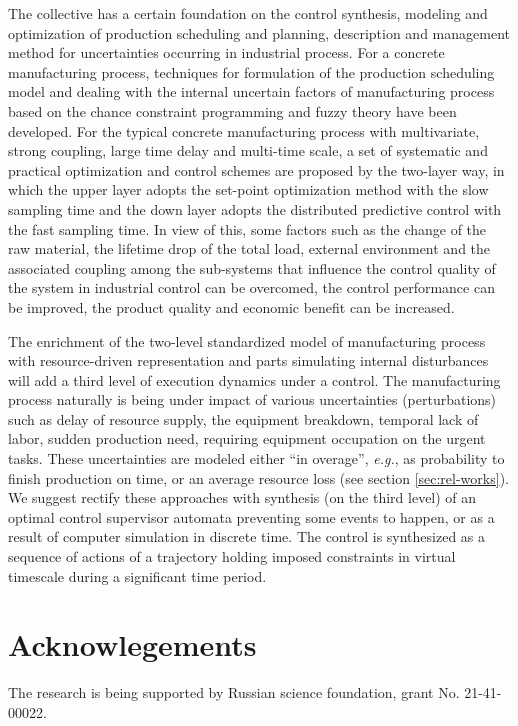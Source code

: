 \documentclass[conference,a4paper]{IEEEtran}
\begin{document}
The collective has a certain foundation on the control synthesis, modeling and optimization of production scheduling and planning, description and management method for uncertainties occurring in industrial process. For a concrete manufacturing process, techniques for formulation of the production scheduling model and dealing with the internal uncertain factors of manufacturing process based on the chance constraint programming and fuzzy theory \cite{b6} have been developed. For the typical concrete manufacturing process with multivariate, strong coupling, large time delay and multi-time scale, a set of systematic and practical optimization and control schemes are proposed by the two-layer way, in which the upper layer adopts the set-point optimization method with the slow sampling time and the down layer adopts the distributed predictive control with the fast sampling time. In view of this, some factors such as the change of the raw material, the lifetime drop of the total load, external environment and the associated coupling among the sub-systems that influence the control quality of the system in industrial control can be overcomed, the control performance can be improved, the product quality and economic benefit can be increased.

The enrichment of the two-level standardized model of manufacturing process with resource-driven representation and parts simulating internal disturbances will add a third level of execution dynamics under a control.  The manufacturing process naturally is being under impact of various uncertainties (perturbations) such as delay of resource supply, the equipment breakdown, temporal lack of labor, sudden production need, requiring equipment occupation on the urgent tasks. These uncertainties are modeled either ``in overage'', \emph{e.g.}, as probability to finish production on time, or an average resource loss (see section \ref{sec:rel-works}).  We suggest rectify these approaches with synthesis (on the third level) of an optimal control supervisor automata preventing some events to happen, or as a result of computer simulation in discrete time. The control is synthesized as a sequence of actions of a trajectory holding imposed constraints in virtual timescale during a significant time period.

\section*{Acknowlegements}
\label{sec:ack}

The research is being supported by Russian science foundation, grant No. 21-41-00022.
\end{document}
